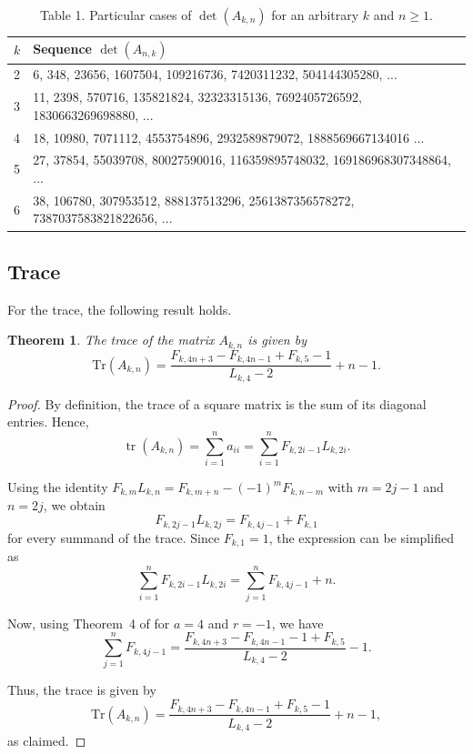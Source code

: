 \documentclass[11pt]{birkjour}
\newtheorem{thm}{Theorem}[section]
\theoremstyle{definition}
\theoremstyle{remark}
\numberwithin{equation}{section}
\begin{document}
\begin{table}[h!]
\begin{tabular}{|l|l|}
\hline $k$ & Sequence $\det(A_{n, k})$ \\
\hline 2 & 6, 348, 23656, 1607504, 109216736, 7420311232, 504144305280, ...  \\
\hline 3 & 11, 2398, 570716, 135821824, 32323315136, 7692405726592, 1830663269698880, ... \\
\hline 4 & 18, 10980, 7071112, 4553754896, 2932589879072, 1888569667134016 ...    \\
\hline 5 & 27, 37854, 55039708, 80027590016, 116359895748032, 169186968307348864, ...  \\

\hline 6 & 38, 106780, 307953512, 888137513296, 2561387356578272, 7387037583821822656, ...  \\
\hline
\end{tabular}
\captionsetup{labelformat=empty}
\caption{Table 1. Particular cases of $\det(A_{k,n})$ for an arbitrary $k$ and $n\geq 1$.}
\end{table}





\normalcolor

\subsection{Trace}

For the trace, the following result holds.

\begin{thm}\label{tracegen}
The trace of the matrix $A_{k,n}$ is given by
\[
\mathrm{Tr}(A_{k,n})=\frac{F_{k,4n+3}-F_{k,4n-1}+F_{k,5}-1}{L_{k,4}-2}+n-1.
\]
\end{thm}

\begin{proof}
By definition, the trace of a square matrix is the sum of its diagonal entries. Hence,
\[
\operatorname{tr}(A_{k,n})
=
\sum_{i=1}^n a_{ii}
=
\sum_{i=1}^n F_{k,2i-1}L_{k,2i}.
\]

\noindent Using the identity $F_{k,m}L_{k,n}=F_{k,m+n}-(-1)^{m}F_{k,n-m}$ with $m=2j-1$ and $n=2j$, we obtain
\[
F_{k,2j-1}L_{k,2j}=F_{k,4j-1}+F_{k,1}
\]
for every summand of the trace. Since $F_{k,1}=1$, the expression can be simplified as
\[
\sum_{i=1}^n F_{k,2i-1}L_{k,2i}
=
\sum_{j=1}^{n}F_{k,4j-1}+n.
\]

\noindent Now, using Theorem~4 of \cite{FalconPlaza2009} for $a=4$ and $r=-1$, we have
\[
\sum_{j=1}^{n}F_{k,4j-1}
=
\frac{F_{k,4n+3}-F_{k,4n-1}-1+F_{k,5}}{L_{k,4}-2}-1.
\]

\noindent Thus, the trace is given by
\[
\mathrm{Tr}(A_{k,n})
=
\frac{F_{k,4n+3}-F_{k,4n-1}+F_{k,5}-1}{L_{k,4}-2}+n-1,
\]
as claimed.
\end{proof}
\end{document}
